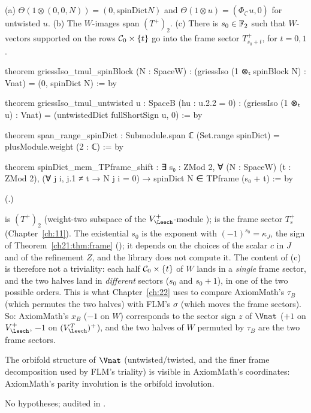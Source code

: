 \begin{theorem}[Blocks]\label{ch21:thm:blocks}
(a) $\Theta(1\otimes(0,0,N))=(0,\mathrm{spinDict}N)$ and $\Theta(1\otimes u)=(\Phi_{\zeta'}u,0)$ for untwisted $u$.
(b) The $W$-images span $(T^+)_2$.
(c) There is $s_0\in\mathbb{F}_2$ such that $W$-vectors supported on the rows $\mathcal{C}_0\times\{t\}$ go into the
frame sector $T^+_{s_0+t}$, for $t=0,1$.
\end{theorem}
\begin{leancode}
theorem griessIso_tmul_spinBlock (N : SpaceW) :
    (griessIso (1 ⊗ₜ spinBlock N) : Vnat) = (0, spinDict N) := by
\end{leancode}
\begin{leancode}
theorem griessIso_tmul_untwisted {u : SpaceB} (hu : u.2.2 = 0) :
    (griessIso (1 ⊗ₜ u) : Vnat) = (untwistedDict fullShortSign u, 0) := by
\end{leancode}
\begin{leancode}
theorem span_range_spinDict :
    Submodule.span ℂ (Set.range spinDict) = plusModule.weight (2 : ℂ) := by
\end{leancode}
\begin{leancode}
theorem spinDict_mem_TPframe_shift :
    ∃ s₀ : ZMod 2, ∀ (N : SpaceW) (t : ZMod 2), (∀ j i, j.1 ≠ t → N j i = 0) →
      spinDict N ∈ TPframe (s₀ + t) := by
\end{leancode}
(.)
\begin{dictionary}
 is $(T^+)_2$ (weight-two subspace of the $V_\Leech^+$-module
);  is the frame sector $T_s^+$ (Chapter~\ref{ch:11}).  The existential
$s_0$ is the exponent with $(-1)^{s_0}=\kappa_J$, the sign of Theorem~\ref{ch21:thm:frame}
(); it depends on the choices of the scalar $c$ in $J$ and of the refinement $Z$,
and the library does not compute it.  The content of (c) is therefore not a triviality: each half
$\mathcal{C}_0\times\{t\}$ of $W$ lands in a \emph{single} frame sector, and the two halves land in
\emph{different} sectors ($s_0$ and $s_0+1$), in one of the two possible orders.  This is what
Chapter~\ref{ch:22} uses to compare AxiomMath's $\tau_B$ (which permutes the two halves) with FLM's $\sigma$
(which moves the frame sectors).  So: AxiomMath's $x_B$ ($-1$ on $W$) corresponds to the sector sign $z$ of
$\Vnat$ ($+1$ on $V_\Leech^+$, $-1$ on $(V_\Leech^T)^+$), and the two halves of $W$ permuted by $\tau_B$
are the two frame sectors.
\end{dictionary}
\begin{physics}
The orbifold structure of $\Vnat$ (untwisted/twisted, and the finer frame decomposition used by FLM's
triality) is visible in AxiomMath's coordinates: AxiomMath's parity involution is the orbifold
involution.
\end{physics}
\begin{status}
No hypotheses; audited in .
\end{status}

